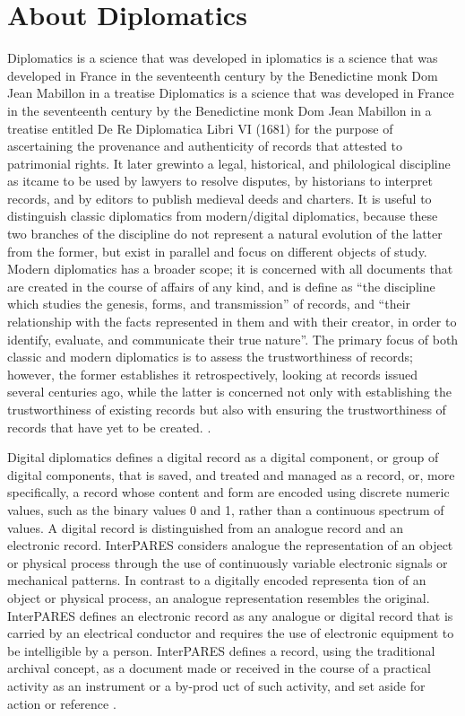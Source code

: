 \section{About Diplomatics}
Diplomatics is a science that was developed in iplomatics is a science that was developed in France in the seventeenth century by the Benedictine
monk Dom Jean Mabillon in a treatise Diplomatics is a science that was developed in France in the seventeenth century by the Benedictine monk Dom Jean Mabillon in a treatise entitled De Re Diplomatica Libri VI (1681) for the purpose of ascertaining the provenance and authenticity of records
that attested to patrimonial rights. It later grewinto a legal, historical, and philological discipline as itcame to be used by lawyers to resolve disputes, by historians to interpret records, and by editors to publish medieval deeds and charters. It is useful to distinguish classic diplomatics from modern/digital diplomatics, because these two branches of the discipline do not represent a natural evolution of the latter from the former, but exist in parallel and focus on different objects of study. Modern diplomatics has a broader scope; it is concerned with all documents that are created in the course of affairs of any kind, and is define as “the discipline which studies the genesis, forms, and transmission” of records, and “their relationship with the facts represented in them and with their creator, in order to identify, evaluate, and communicate their true nature”. The primary focus of both classic and modern diplomatics is to assess the trustworthiness of records; however, the former establishes it retrospectively, looking at records issued several centuries ago, while the latter is concerned not only with establishing the trustworthiness of existing records but also with ensuring the trustworthiness of records that have yet to be created. \cite[10]{kirschenbaum2010digital}. 

Digital diplomatics defines a digital record as a digital component, or group of digital components, that is saved, and treated and managed as a record, or, more specifically, a record whose content and form are encoded using discrete numeric values, such as the binary values 0 and 1, rather than a continuous spectrum of values. A digital record is distinguished from an analogue record and an electronic record. InterPARES considers analogue the representation of an object or physical process through the use of continuously variable electronic signals or mechanical patterns. In contrast to a digitally encoded representa tion of an object or physical process, an analogue representation resembles the original. InterPARES defines an electronic record as any analogue or digital record that is carried by an electrical conductor and requires the use of electronic equipment to be intelligible by a person. InterPARES defines a record, using the traditional archival concept, as a document made or received in the course of a practical activity as an instrument or a by-prod uct of such activity, and set aside for action or reference \cite[52]{duranti2009digital}.

